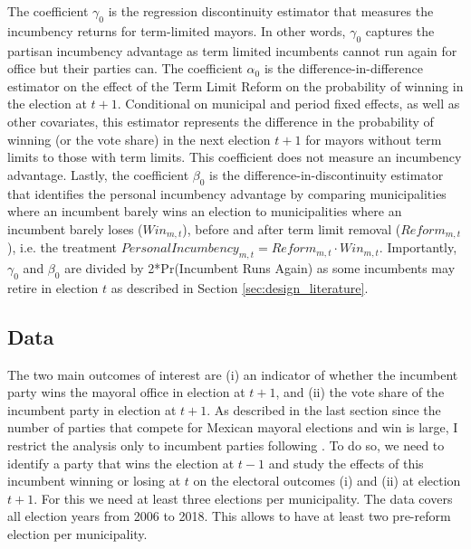 The coefficient $\gamma_0$ is the regression discontinuity estimator that measures the incumbency returns for term-limited mayors. In other words, $\gamma_0$ captures the partisan incumbency advantage as term limited incumbents cannot run again for office but their parties can. The coefficient $\alpha_0$ is the difference-in-difference estimator on the effect of the Term Limit Reform on the probability of winning in the election at $t+1$. Conditional on municipal and period fixed effects, as well as other covariates, this estimator represents the difference in the probability of winning (or the vote share) in the next election $t+1$ for mayors without term limits to those with term limits. This coefficient does not measure an incumbency advantage. Lastly, the coefficient $\beta_0$ is the difference-in-discontinuity estimator that identifies the personal incumbency advantage by comparing municipalities where an incumbent barely wins an election to municipalities where an incumbent barely loses ($Win_{m,t}$), before and after term limit removal ($Reform_{m,t}$), i.e. the treatment $PersonalIncumbency_{m,t}=Reform_{m,t} \cdot Win_{m,t}$. Importantly, $\gamma_0$ and $\beta_0$ are divided by 2*Pr(Incumbent Runs Again) as some incumbents may retire in election $t$ as described in Section \ref{sec:design_literature}. 
 

\subsection{Data}  

The two main outcomes of interest are (i) an indicator of whether the incumbent party wins the mayoral office in election at $t+1$, and (ii) the vote share of the incumbent party in election at $t+1$. As described in the last section since the number of parties that compete for Mexican mayoral elections and win is large, I restrict the analysis only to incumbent parties following \citet{klasnja_titiunik_2017}. To do so, we need to identify a party that wins the election at $t-1$ and study the effects of this incumbent winning or losing at $t$ on the electoral outcomes (i) and (ii) at election $t+1$. For this we need at least three elections per municipality. The data covers all election years from 2006 to 2018. This allows to have at least two pre-reform election per municipality. 


